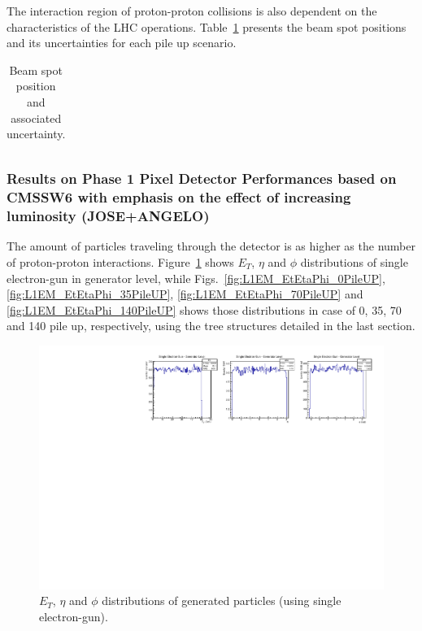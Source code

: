 The interaction region of proton-proton collisions is also dependent on the characteristics of the LHC operations.
Table~\ref{tab:beam_spot} presents the beam spot positions and its uncertainties for each pile up scenario.

\begin{table}[!htb]
  \centering
  \caption{Beam spot position and associated uncertainty.}
  \label{tab:beam_spot}
  \begin{tabular}{ccc}
  \end{tabular}
\end{table}


\subsubsection{Results on Phase 1 Pixel Detector Performances based on CMSSW6 with emphasis on the effect of increasing luminosity
(JOSE+ANGELO)}


The amount of particles traveling through the detector is as higher as the number of proton-proton interactions.
Figure~\ref{fig:GenParticles_EtEtaPhi} shows $E_{T}$, $\eta$ and $\phi$ distributions of single electron-gun in
generator level, while Figs.~\ref{fig:L1EM_EtEtaPhi_0PileUP}, \ref{fig:L1EM_EtEtaPhi_35PileUP},
\ref{fig:L1EM_EtEtaPhi_70PileUP} and \ref{fig:L1EM_EtEtaPhi_140PileUP} shows those distributions in case of
0, 35, 70 and 140 pile up, respectively, using the tree structures detailed in the last section.

\begin{figure}[!htb]
  \centering
  \includegraphics[scale=0.8]{../SimulationTools/GenParticles_EtEtaPhi.pdf}
  \caption{$E_{T}$, $\eta$ and $\phi$ distributions of generated particles (using single electron-gun).}
  \label{fig:GenParticles_EtEtaPhi}
\end{figure}

